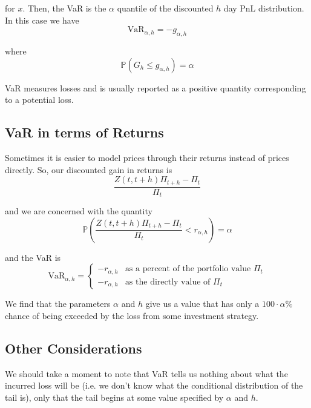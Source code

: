 \documentclass[12pt]{article}
\newlength\tindent
\renewcommand{\indent}{\hspace*{\tindent}}
\renewcommand{\P}{\mathbb P}
\begin{document}
for $x$. Then, the VaR is the $\alpha$ quantile of the discounted $h$ day PnL distribution. In this case we have
\begin{equation*}
	\text{VaR}_{\alpha, h} = -g_{\alpha, h}
\end{equation*}

where 
\begin{equation*}
	\P ( G_h \leq g_{\alpha, h} ) = \alpha
\end{equation*}

\indent VaR measures losses and is usually reported as a positive quantity corresponding to a potential loss. 

\subsection{VaR in terms of Returns}

Sometimes it is easier to model prices through their returns instead of prices directly. So, our discounted gain in returns is
\begin{equation*}
	\frac{ Z(t, t + h) \Pi_{t + h} - \Pi_t }{ \Pi_t }
\end{equation*}

and we are concerned with the quantity
\begin{equation*}
	\P \left( 	\frac{ Z(t, t + h) \Pi_{t + h} - \Pi_t }{ \Pi_t } < r_{\alpha, h} \right) = \alpha
\end{equation*}

and the VaR is
\begin{equation*}
	\text{VaR}_{\alpha, h} = 
	\begin{cases}
		-r_{\alpha, h} & \text{as a percent of the portfolio value $\Pi_t$} \\
		-r_{\alpha, h} & \text{as the directly value of $\Pi_t$}
	\end{cases}
\end{equation*}

\indent We find that the parameters $\alpha$ and $h$ give us a value that has only a $100\cdot\alpha\%$ chance of being exceeded by the loss from some investment strategy. \\

\subsection{Other Considerations}

\indent We should take a moment to note that VaR tells us nothing about what the incurred loss will be (i.e. we don't know what the conditional distribution of the tail is), only that the tail begins at some value specified by $\alpha$ and $h$. \\
\end{document}
